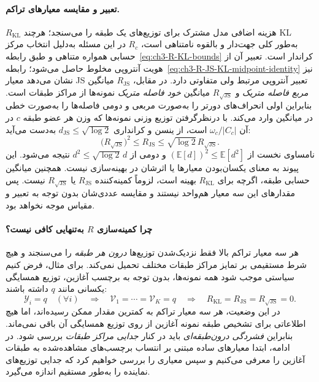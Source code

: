 \paragraph{تعبیر و مقایسه معیارهای تراکم.}
$R_{\mathrm{KL}}$ هزینه اضافی مدل مشترک
برای توزیع‌های یک طبقه را می‌سنجد؛
هرچند KL به‌طور کلی جهت‌دار و بالقوه نامتناهی است،
$R_c$ در این مسئله به‌دلیل انتخاب مرکز حسابی
همواره متناهی و طبق
رابطه~\eqref{eq:ch3-R-KL-bounds}
کراندار است. تعبیر آن از هویت
آنتروپی مخلوط حاصل می‌شود؛
رابطه~\eqref{eq:ch3-R-JS-KL-midpoint-identity}
نیز نشان می‌دهد معیار JS تعبیر
آنتروپی مرتبط ولی متفاوتی دارد.
در مقابل، $R_{\mathrm{JS}}$ میانگین
\emph{مربع فاصله متریک} و
$R_{\sqrt{\mathrm{JS}}}$ میانگین
\emph{خود فاصله متریک} نمونه‌ها
از مراکز طبقات است. بنابراین اولی
انحراف‌های دورتر را به‌صورت مربعی
و دومی فاصله‌ها را به‌صورت خطی
در میانگین وارد می‌کند.
با درنظرگرفتن توزیع وزنی نمونه‌ها
که وزن هر عضو طبقه $c$ در آن
$\omega_c/|C_c|$ است،
از ینسن و کرانداری
$d_{\mathrm{JS}}\le\sqrt{\log2}$
به‌دست می‌آید:
\[
\bigl(R_{\sqrt{\mathrm{JS}}}\bigr)^2
\le R_{\mathrm{JS}}
\le \sqrt{\log2}\,R_{\sqrt{\mathrm{JS}}}.
\]
نامساوی نخست از
$(\mathbb E[d])^2\le\mathbb E[d^2]$
و دومی از $d^2\le\sqrt{\log2}\,d$
نتیجه می‌شود.
این پیوند به معنای
یکسان‌بودن معیارها یا اثرشان
در بهینه‌سازی نیست.
همچنین میانگین حسابی طبقه،
اگرچه برای $R_{\mathrm{KL}}$ بهینه است،
لزوماً کمینه‌کننده
$R_{\mathrm{JS}}$ یا
$R_{\sqrt{\mathrm{JS}}}$ نیست.
پس مقدارهای این سه معیار
هم‌واحد نیستند و مقایسه عددی‌شان
بدون توجه به تعبیر و مقیاس
موجه نخواهد بود.

\paragraph{چرا کمینه‌سازی $R$ به‌تنهایی کافی نیست؟}
هر سه معیار تراکم بالا فقط نزدیک‌شدن توزیع‌ها \emph{درون هر طبقه} را می‌سنجند و هیچ شرط مستقیمی بر تمایز مراکز طبقات مختلف تحمیل نمی‌کند. برای مثال، فرض کنیم سیاستی موجب شود همه نمونه‌ها، بدون توجه به برچسب آغازین، توزیع همسایگی یکسانی مانند $q$ داشته باشند:
\begin{equation}\label{eq:ch3-R-collapse}
\mathscr Y_i=q\quad(\forall i)
\quad\Longrightarrow\quad
\mathcal V_1=\cdots=\mathcal V_K=q
\quad\Longrightarrow\quad
R_{\mathrm{KL}}=R_{\mathrm{JS}}=R_{\sqrt{\mathrm{JS}}}=0.
\end{equation}
در این وضعیت، هر سه معیار تراکم به کمترین مقدار ممکن رسیده‌اند، اما هیچ اطلاعاتی برای تشخیص طبقه نمونه آغازین از روی توزیع همسایگی آن باقی نمی‌ماند. بنابراین \emph{فشردگی درون‌طبقه‌ای} باید در کنار \emph{جدایی مراکز طبقات} بررسی شود. در ادامه، ابتدا معیارهای ساده مبتنی بر انتساب برچسب‌های مشاهده‌شده به طبقات آغازین را معرفی می‌کنیم و سپس معیاری را بررسی خواهیم کرد که جدایی توزیع‌های نماینده را به‌طور مستقیم اندازه می‌گیرد.


